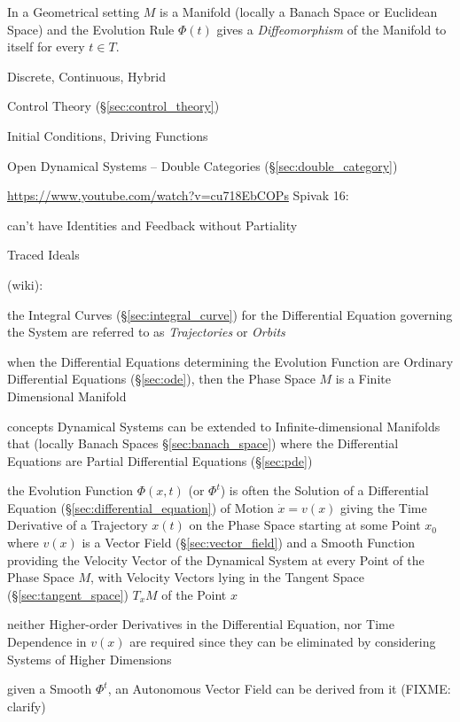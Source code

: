 In a Geometrical setting $M$ is a Manifold (locally a Banach Space or Euclidean
Space) and the Evolution Rule $\Phi(t)$ gives a \emph{Diffeomorphism} of the
Manifold to itself for every $t \in T$. %

Discrete, Continuous, Hybrid

Control Theory (\S\ref{sec:control_theory})

Initial Conditions, Driving Functions


Open Dynamical Systems -- Double Categories (\S\ref{sec:double_category})

\url{https://www.youtube.com/watch?v=cu718EbCOPs} Spivak 16:

can't have Identities and Feedback without Partiality %

Traced Ideals %

(wiki):

the Integral Curves (\S\ref{sec:integral_curve}) for the Differential Equation
governing the System are referred to as \emph{Trajectories} or \emph{Orbits}

when the Differential Equations determining the Evolution Function are Ordinary
Differential Equations (\S\ref{sec:ode}), then the Phase Space $M$ is a Finite
Dimensional Manifold

concepts Dynamical Systems can be extended to Infinite-dimensional Manifolds
that (locally Banach Spaces \S\ref{sec:banach_space}) where the Differential
Equations are Partial Differential Equations (\S\ref{sec:pde})

the Evolution Function $\Phi(x,t)$ (or $\Phi^t$) is often the Solution of a
Differential Equation (\S\ref{sec:differential_equation}) of Motion $\dot{x} =
v(x)$ giving the Time Derivative of a Trajectory $x(t)$ on the Phase Space
starting at some Point $x_0$ where $v(x)$ is a Vector Field
(\S\ref{sec:vector_field}) and a Smooth Function providing the Velocity Vector
of the Dynamical System at every Point of the Phase Space $M$, with Velocity
Vectors lying in the Tangent Space (\S\ref{sec:tangent_space}) $T_xM$ of the
Point $x$

neither Higher-order Derivatives in the Differential Equation, nor Time
Dependence in $v(x)$ are required since they can be eliminated by considering
Systems of Higher Dimensions

given a Smooth $\Phi^t$, an Autonomous Vector Field can be derived from it
(FIXME: clarify)

